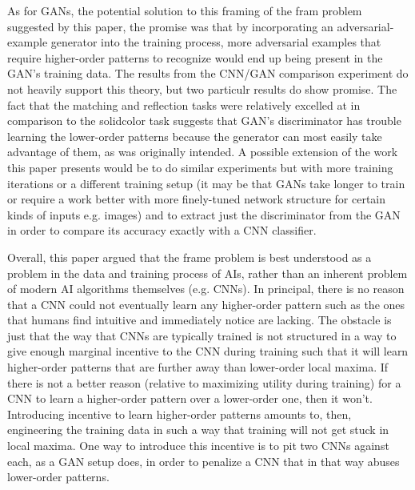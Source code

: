\documentclass{article}
\begin{document}
As for GANs, the potential solution to this framing of the fram problem suggested by this paper, the promise was that by incorporating an adversarial-example generator into the training process, more adversarial examples that require higher-order patterns to recognize would end up being present in the GAN's training data.
The results from the CNN/GAN comparison experiment do not heavily support this theory, but two particulr results do show promise.
The fact that the matching and reflection tasks were relatively excelled at in comparison to the solidcolor task suggests that GAN's discriminator has trouble learning the lower-order patterns because the generator can most easily take advantage of them, as was originally intended.
A possible extension of the work this paper presents would be to do similar experiments but with more training iterations or a different training setup (it may be that GANs take longer to train or require a work better with more finely-tuned network structure for certain kinds of inputs e.g. images) and to extract just the discriminator from the GAN in order to compare its accuracy exactly with a CNN classifier.

Overall, this paper argued that the frame problem is best understood as a problem in the data and training process of AIs, rather than an inherent problem of modern AI algorithms themselves (e.g. CNNs).
In principal, there is no reason that a CNN could not eventually learn any higher-order pattern such as the ones that humans find intuitive and immediately notice are lacking.
The obstacle is just that the way that CNNs are typically trained is not structured in a way to give enough marginal incentive to the CNN during training such that it will learn higher-order patterns that are further away than lower-order local maxima.
If there is not a better reason (relative to maximizing utility during training) for a CNN to learn a higher-order pattern over a lower-order one, then it won't.
Introducing incentive to learn higher-order patterns amounts to, then, engineering the training data in such a way that training will not get stuck in local maxima.
One way to introduce this incentive is to pit two CNNs against each, as a GAN setup does, in order to penalize a CNN that in that way abuses lower-order patterns.
\end{document}
